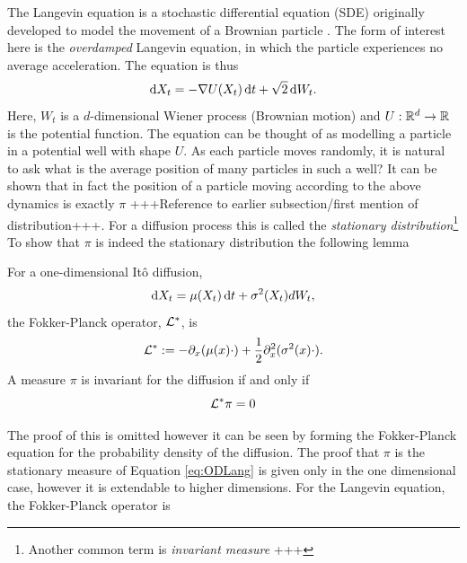 The Langevin equation is a stochastic differential equation (SDE) originally developed to model the movement of a Brownian particle 	\cite{Langevin1908}. The form of interest here is the \emph{overdamped} Langevin equation, in which the particle experiences no average acceleration. The equation is thus
	\begin{equation} \mathop{}\!\mathrm{d} X_t = -\nabla U(X_t)\mathop{}\!\mathrm{d} t +\sqrt{2}\mathop{}\!\mathrm{d} W_t. \label{eq:ODLang}\end{equation}
Here, \(W_t\) is a \(d\)-dimensional Wiener process (Brownian motion) and \(U:\mathbb{R}^d \to \mathbb{R}\) is the potential function. The equation can be thought of as modelling a particle in a potential well with shape \(U\). As each particle moves randomly, it is natural to ask what is the average position of many particles in such a well? It can be shown that in fact the position of a particle moving according to the above dynamics is exactly \(\pi\) +++Reference to earlier subsection/first mention of distribution+++. For a diffusion process this is called the \emph{stationary distribution}\footnote{Another common term is \emph{invariant measure} +++} To show that \(\pi\) is indeed the stationary distribution the following lemma

\begin{lemma}
	For a one-dimensional It\^o diffusion,
	\[\mathop{}\!\mathrm{d} X_t = \mu(X_t)\mathop{}\!\mathrm{d} t + \sigma^2(X_t)dW_t,\]
	the Fokker-Planck operator, \(\mathcal{L}^*\), is
	\[\mathcal{L}^*:= -\partial_x(\mu(x)\cdot)+\frac{1}{2}\partial^2_x(\sigma^2(x)\cdot).\]
	A measure \(\pi\) is invariant for the diffusion if and only if
	\[\mathcal{L}^*\pi = 0\]
\end{lemma}
The proof of this is omitted however it can be seen by forming the Fokker-Planck equation for the probability density of the diffusion. The proof that \(\pi\) is the stationary measure of Equation \eqref{eq:ODLang} is given only in the one dimensional case, however it is extendable to higher dimensions. For the Langevin equation, the Fokker-Planck operator is


